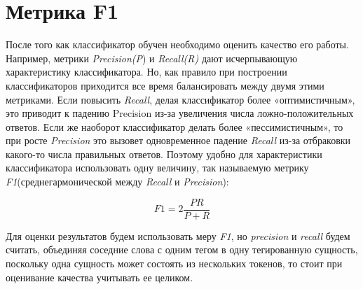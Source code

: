 \documentclass{csmathnotes}
\begin{document}
\section*{Метрика F1}
После того как классификатор обучен необходимо оценить качество его работы. Например, метрики \emph{Precision(P}) и \emph{Recall(R)} дают исчерпывающую характеристику классификатора. Но, как правило при построении классификаторов приходится все время балансировать между двумя этими метриками. Если повысить \emph{Recall}, делая классификатор более «оптимистичным», это приводит к падению Precision из-за увеличения числа ложно-положительных ответов. Если же наоборот классификатор делать более «пессимистичным», то при росте \emph{Precision} это вызовет одновременное падение \emph{Recall} из-за отбраковки какого-то числа правильных ответов. Поэтому удобно для характеристики классификатора использовать одну величину, так называемую метрику \emph{F1}(среднегармонической между \emph{Recall} и \emph{Precision}):

\begin{equation}\label{eq:f1}
F1 = 2\frac{P R}{P + R} 
\end{equation}

Для оценки результатов будем использовать меру \emph{F1}, но \emph{precision} и \emph{recall} будем считать, объединяя соседние слова с одним тегом в одну тегированную сущность, поскольку одна сущность может состоять из нескольких токенов, то стоит при оценивание качества учитывать ее целиком. 
\end{document}
